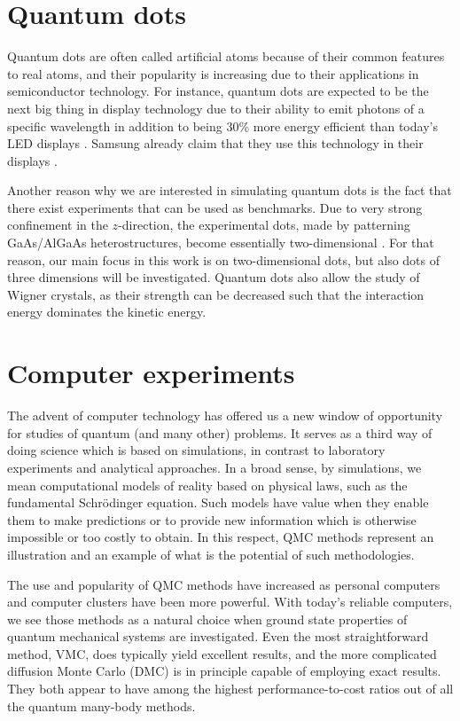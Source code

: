 \section{Quantum dots}
Quantum dots are often called artificial atoms because of their common features to real atoms, and their popularity is increasing due to their applications in semiconductor technology. For instance, quantum dots are expected to be the next big thing in display technology due to their ability to emit photons of a specific wavelength in addition to being 30\% more energy efficient than today's LED displays \cite{manders_8.3:_2015}. Samsung already claim that they use this technology in their displays \cite{noauthor_2019_nodate}.

Another reason why we are interested in simulating quantum dots is the fact that there exist experiments that can be used as benchmarks. Due to very strong confinement in the $z$-direction, the experimental dots, made by patterning GaAs/AlGaAs heterostructures, become essentially two-dimensional \cite{marzin_photoluminescence_1994,brunner_sharp-line_1994}. For that reason, our main focus in this work is on two-dimensional dots, but also dots of three dimensions will be investigated. Quantum dots also allow the study of Wigner crystals, as their strength can be decreased such that the interaction energy dominates the kinetic energy. 

\section{Computer experiments}
The advent of computer technology has offered us a new window of opportunity for studies of quantum (and many other) problems. It serves as a third way of doing science which is based on simulations, in contrast to laboratory experiments and analytical approaches. In a broad sense, by simulations, we mean computational models of reality based on physical laws, such as the fundamental Schrödinger equation. Such models have value when they enable them to make predictions or to provide new information which is otherwise impossible or too costly to obtain. In this respect, QMC methods represent an illustration and an example of what is the potential of such methodologies.

The use and popularity of QMC methods have increased as personal computers and computer clusters have been more powerful. With today's reliable computers, we see those methods as a natural choice when ground state properties of quantum mechanical systems are investigated. Even the most straightforward method, VMC, does typically yield excellent results, and the more complicated diffusion Monte Carlo (DMC) is in principle capable of employing exact results. They both appear to have among the highest performance-to-cost ratios out of all the quantum many-body methods. 

